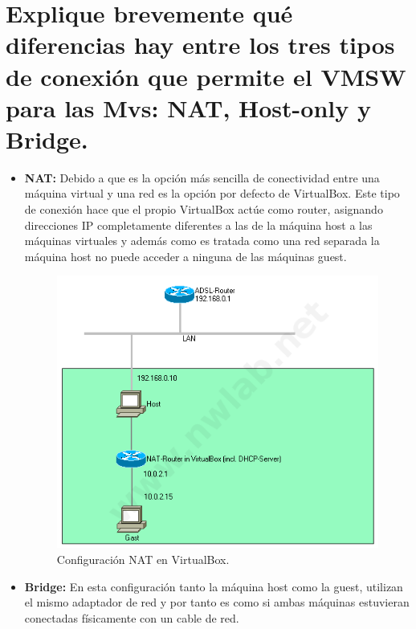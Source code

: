 \section{Explique brevemente qué diferencias hay entre los tres tipos de conexión que permite el VMSW para las Mvs: NAT, Host-only y Bridge.}

\begin{itemize}
	\item \textbf{NAT:} Debido a que es la opción más sencilla de conectividad entre una máquina virtual y una red es la opción por defecto de VirtualBox. Este tipo de conexión hace que el propio VirtualBox actúe como router, asignando direcciones IP completamente diferentes a las de la máquina host a las máquinas virtuales y además como es tratada como una red separada la máquina host no puede acceder a ninguna de las máquinas guest.
		\begin{figure}[H]
			\centering
			\includegraphics[scale=0.5]{nat-virtualbox.png}
			\caption{Configuración NAT en VirtualBox.\cite{figura141} \label{fig:figura2}}
		\end{figure}
	\item \textbf{Bridge:} En esta configuración tanto la máquina host como la guest, utilizan el mismo adaptador de red y por tanto es como si ambas máquinas estuvieran conectadas físicamente con un cable de red.
		\begin{figure}[H]
			\centering

\end{figure}
\end{itemize}
